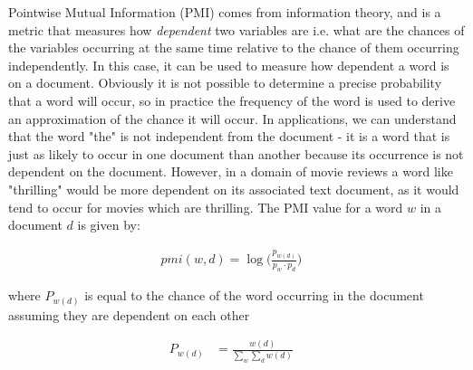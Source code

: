 



Pointwise Mutual Information (PMI) comes from  information theory, and is a metric that measures how \textit{dependent}  two variables are i.e. what are the chances of the variables occurring  at the same time  relative to the chance of them occurring independently. In this case, it can be used to measure how dependent a word is on a document. Obviously it is not possible to determine a precise probability that a word will occur, so in practice the frequency of the word is used to derive an approximation of the chance it will occur. In applications, we can understand that the word "the" is not independent from the document - it is a word that is just as likely to occur in one document than another because its occurrence is not dependent on the document. However, in a domain of movie reviews a word like "thrilling" would be more dependent on its associated text document, as it would tend to occur for movies which are thrilling. The PMI value for a word $w$ in a document  $d$ is given by:


\begin{align*}
\textit{pmi}(w, d) = \log\big(\frac{p_{{w}(d)}}{p_{w} \cdotp p_{d}}\big) &
\end{align*}

where $P_{{w}(d)}$ is equal to the chance of the word occurring in the document assuming they are dependent on each other 



\begin{align*}
P_{{w}(d)} &= \frac{{w}(d)}{\sum_{w} \sum_{d} {w}(d)} &
\end{align*}

